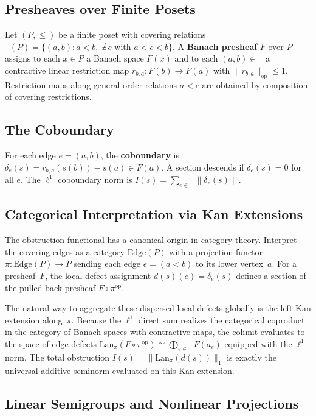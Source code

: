 \documentclass[12pt,a4paper]{amsart}
\theoremstyle{plain}
\theoremstyle{definition}
\theoremstyle{remark}
\newcommand{\op}{\mathrm{op}}
\newcommand{\Lan}{\mathrm{Lan}}
\DeclareMathOperator{\Ecov}{E_{\text{cov}}}
\begin{document}
\subsection{Presheaves over Finite Posets}

Let $(P,\leq)$ be a finite poset with covering relations
$\Ecov(P) = \{(a,b) : a < b,\; \nexists\, c \text{ with } a < c < b\}$.
A \textbf{Banach presheaf} $F$ over $P$ assigns to each $x \in P$ a
Banach space $F(x)$ and to each $(a,b) \in \Ecov$ a contractive linear
restriction map $r_{b,a}\colon F(b) \to F(a)$ with
$\|r_{b,a}\|_{\op} \leq 1$. Restriction maps along general order
relations $a < c$ are obtained by composition of covering restrictions.

\subsection{The Coboundary}

For each edge $e = (a,b)$, the \textbf{coboundary} is
$\delta_e(s) = r_{b,a}(s(b)) - s(a) \in F(a)$.
A section descends if $\delta_e(s) = 0$ for all $e$.
The $\ell^1$ coboundary norm is
$I(s) = \sum_{e \in \Ecov} \|\delta_e(s)\|$.

\subsection{Categorical Interpretation via Kan Extensions}

The obstruction functional has a canonical origin in category theory.
Interpret the covering edges as a category $\mathrm{Edge}(P)$ with a
projection functor $\pi\colon \mathrm{Edge}(P) \to P$ sending each
edge $e = (a < b)$ to its lower vertex~$a$. For a presheaf~$F$, the
local defect assignment $d(s)(e) = \delta_e(s)$ defines a section of
the pulled-back presheaf $F \circ \pi^{\op}$.

The natural way to aggregate these dispersed local defects globally is
the left Kan extension along~$\pi$. Because the $\ell^1$ direct sum
realizes the categorical coproduct in the category of Banach spaces
with contractive maps, the colimit evaluates to the space of edge
defects
$\Lan_\pi(F \circ \pi^{\op}) \cong \bigoplus_{e \in \Ecov} F(a_e)$
equipped with the $\ell^1$ norm. The total obstruction
$I(s) = \|\Lan_\pi(d(s))\|_1$ is exactly the universal additive
seminorm evaluated on this Kan extension.

\subsection{Linear Semigroups and Nonlinear Projections}
\end{document}

